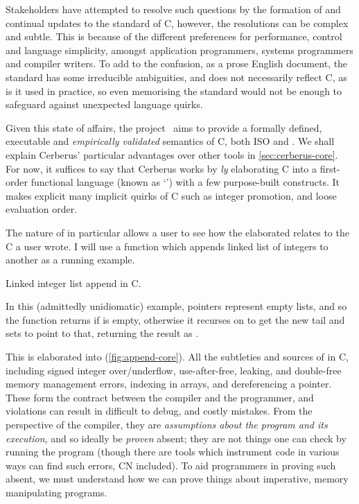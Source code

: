 Stakeholders have attempted to resolve such questions by the formation of and
continual updates to the  standard of C,\cite{isoC1990} however, the
resolutions can be complex and subtle. This is because of the different
preferences for performance, control and language simplicity, amongst
application programmers, systems programmers and compiler writers. To add to
the confusion, as a prose English document, the standard has some irreducible
ambiguities, and does not necessarily reflect  C, as is it
used in practice, so even memorising the standard would not be enough to
safeguard against unexpected language quirks.

Given this state of affairs, the 
project~ aims to provide a formally defined,
executable and \emph{empirically validated} semantics of C, both ISO and . We shall explain Cerberus' particular advantages over other tools in
\cref{sec:cerberus-core}. For now, it suffices to say that Cerberus works by
\emph{ly} elaborating C into a first-order functional
language (known as `') with a few purpose-built constructs. It
makes explicit many implicit quirks of C such as integer promotion,  and
loose evaluation order.

The  nature of in particular allows a user to see how the
elaborated  relates to the C a user wrote. I will use a function which
appends linked list of integers to another as a running example.

\begin{marginfigure}
    \centering
    \caption{Linked integer list append in C.}\label{fig:append-c}
\end{marginfigure}%

In this (admittedly unidiomatic) example,  pointers represent
empty lists, and so the function returns  if  is empty,
otherwise it recurses on  to get the new tail
 and sets  to point to that,  returning the
result as .

This is elaborated into  (\cref{fig:append-core}). All the
subtleties and sources of  in C, including signed integer over/underflow,
use-after-free, leaking, and double-free memory management errors,
 indexing in arrays, and dereferencing a 
pointer. These form the contract between the compiler and the programmer, and
violations can result in difficult to debug, and costly mistakes. From the
perspective of the compiler, they are \emph{assumptions about the program and
its execution}, and so ideally be \emph{proven} absent; they are not things one
can check by running the program (though there are tools which instrument code
in various ways can find such errors, CN included). To aid programmers in
proving such  absent, we must understand how we can prove things about
imperative, memory manipulating programs.

